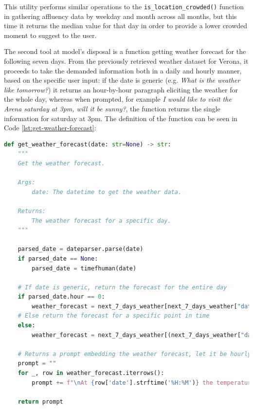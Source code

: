 This utility performs similar operations to the \texttt{is\_location\_crowded()} function in gathering affluency data by weekday and month across all months, but this time it returns the median value for that day in order to provide a lower crowded moment to suggest to the user.

The second tool at model's disposal is a function getting weather forecast for the following seven days. From the previously retrieved weather dataset for Verona, it proceeds to take the demanded information both in a daily and hourly manner, based on the specific user input: if the date is generic (e.g. \textit{What is the weather like tomorrow?}) it returns an hour-by-hour paragraph eliciting the weather for the whole day, whereas when prompted, for example \textit{I would like to visit the Arena saturday at 3pm, will it be sunny?}, the function returns the single information for saturday at 3pm. The definition of the function can be seen in Code \ref{lst:get-weather-forecast}:


\begin{center}
\begin{lstlisting}[language=Python, frame=single, caption=\texttt{get\_weather\_forecast()} Function., label=lst:get-weather-forecast]
def get_weather_forecast(date: str=None) -> str:
    """
    Get the weather forecast.

    Args:
        date: The datetime to get the weather data.

    Returns:
        The weather forecast for a specific day.
    """

    parsed_date = dateparser.parse(date)
    if parsed_date == None:
        parsed_date = timefhuman(date)

    # If date is generic, return the forecast for the entire day
    if parsed_date.hour == 0:
        weather_forecast = next_7_days_weather[next_7_days_weather["date"].dt.date == parsed_date.date()]
    # Else return the forecast for a specific point in time
    else:
        weather_forecast = next_7_days_weather[(next_7_days_weather["date"].dt.date == parsed_date.date()) & (next_7_days_weather["date"].dt.hour == parsed_date.hour)]

    # Returns a prompt embedding the weather forecast, let it be hourly or specific data
    prompt = ""
    for _, row in weather_forecast.iterrows():
        prompt += f"\nAt {row['date'].strftime('%H:%M')} the temperature is {int(row['temperature'])}C with {row['weather_description'].lower()}. The precipitation probability is {int(row['precipitation_probability'])}%."

    return prompt
\end{lstlisting}
\end{center}

